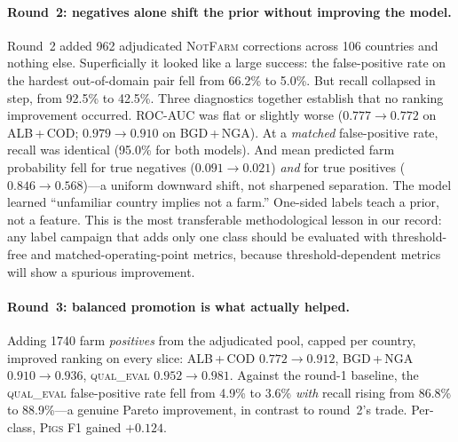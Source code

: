 \documentclass[11pt,a4paper]{article}
\begin{document}
\paragraph{Round~2: negatives alone shift the prior without improving the model.}
Round~2 added \num{962} adjudicated \textsc{NotFarm} corrections across 106
countries and nothing else. Superficially it looked like a large success: the
false-positive rate on the hardest out-of-domain pair fell from 66.2\% to 5.0\%.
But recall collapsed in step, from 92.5\% to 42.5\%. Three diagnostics together
establish that no ranking improvement occurred. ROC-AUC was flat or slightly
worse ($0.777 \rightarrow 0.772$ on ALB\,+\,COD; $0.979 \rightarrow 0.910$ on
BGD\,+\,NGA). At a \emph{matched} false-positive rate, recall was identical
(95.0\% for both models). And mean predicted farm probability fell for true
negatives ($0.091 \rightarrow 0.021$) \emph{and} for true positives
($0.846 \rightarrow 0.568$)---a uniform downward shift, not sharpened
separation. The model learned ``unfamiliar country implies not a farm.''
One-sided labels teach a prior, not a feature. This is the most transferable
methodological lesson in our record: any label campaign that adds only one class
should be evaluated with threshold-free and matched-operating-point metrics,
because threshold-dependent metrics will show a spurious improvement.

\paragraph{Round~3: balanced promotion is what actually helped.}
Adding \num{1740} farm \emph{positives} from the adjudicated pool, capped per
country, improved ranking on every slice: ALB\,+\,COD $0.772 \rightarrow 0.912$,
BGD\,+\,NGA $0.910 \rightarrow 0.936$, \textsc{qual\_eval} $0.952 \rightarrow
0.981$. Against the round-1 baseline, the \textsc{qual\_eval} false-positive rate
fell from 4.9\% to 3.6\% \emph{with} recall rising from 86.8\% to 88.9\%---a
genuine Pareto improvement, in contrast to round~2's trade. Per-class,
\textsc{Pigs} F1 gained $+0.124$.
\end{document}
